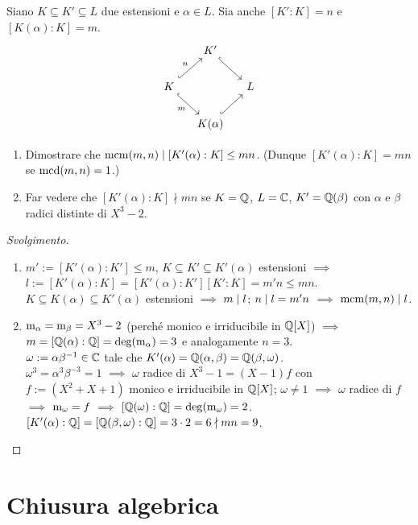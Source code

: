\begin{eser}
Siano $K\subseteq K'\subseteq L$ due estensioni e $\alpha \in L$. Sia anche $[K':K]=n$ e $[K(\alpha):K]=m$.
\[\begin{tikzcd}[column sep=small]
& K' \ar[dr, hookrightarrow] \\
K \ar["n", ur, hookrightarrow] \ar["m", hookrightarrow, dr, swap] & & L \\
& K(\alpha) \ar[ur, hookrightarrow]
\end{tikzcd}\]
\begin{enumerate}
\item Dimostrare che ${\rm mcm}(m,n) \mid [K'(\alpha):K] \le mn$. (Dunque $[K'(\alpha):K]=mn$ se ${\rm mcd}(m,n)=1$.)
\item Far vedere che $[K'(\alpha):K] \nmid mn$ se $K=\mathbb{Q}$, $L=\mathbb{C}$, $K'=\mathbb{Q}(\beta)$ con $\alpha$ e $\beta$ radici distinte di $X^3-2$.
\end{enumerate}
\end{eser}

\begin{proof}[Svolgimento]
\begin{enumerate}
\item $m':=[K'(\alpha):K']\le m$, $K\subseteq K'\subseteq K'(\alpha)$ estensioni $\implies$ $l:=[K'(\alpha):K]=[K'(\alpha):K'][K':K]=m'n\le mn$. $K\subseteq K(\alpha)\subseteq K'(\alpha)$ estensioni $\implies$ $m\mid l$; $n\mid l=m'n$ $\implies$ ${\rm mcm}(m,n)\mid l$. 
\item $\mathrm{m}_{\alpha}=\mathrm{m}_{\beta}=X^3-2$ (perché monico e irriducibile in $\mathbb{Q}[X]$) $\implies$ $m=[\mathbb{Q}(\alpha):\mathbb{Q}]=\deg(\mathrm{m}_{\alpha})=3$ e analogamente $n=3$. \\
$\omega:=\alpha\beta^{-1}\in\mathbb{C}$ tale che $K'(\alpha)=\mathbb{Q}(\alpha,\beta)=\mathbb{Q}(\beta,\omega)$.\\
$\omega^3=\alpha^3\beta^{-3}=1$ $\implies$ $\omega$ radice di $X^3-1=(X-1)f$ con $f:=(X^2+X+1)$ monico e irriducibile in $\mathbb{Q}[X]$; $\omega\ne1$ $\implies$ $\omega$ radice di $f$ $\implies$ $\mathrm{m}_{\omega}=f$ $\implies$ $[\mathbb{Q}(\omega):\mathbb{Q}]=\deg(\mathrm{m}_{\omega})=2$. \\
$[K'(\alpha):\mathbb{Q}]=[\mathbb{Q}(\beta,\omega):\mathbb{Q}]=3\cdot2=6\nmid mn=9$. \qedhere
\end{enumerate}
\end{proof}


\section{Chiusura algebrica}

